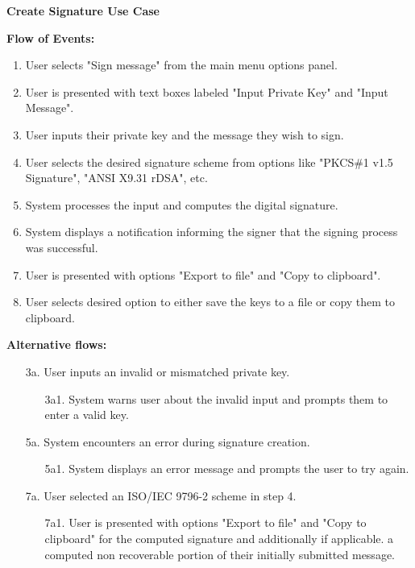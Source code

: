 \documentclass[]{final_report}
\theoremstyle{definition}
\begin{document}
\textbf{Create Signature Use Case}

\noindent\textbf{Flow of Events:}
\begin{enumerate}
    \item User selects "Sign message" from the main menu options panel.
    \item User is presented with text boxes labeled "Input Private Key" and "Input Message".
    \item User inputs their private key and the message they wish to sign.
    \item User selects the desired signature scheme from options like "PKCS\#1 v1.5 Signature", "ANSI X9.31 rDSA", etc.
    \item System processes the input and computes the digital signature.
    \item System displays a notification informing the signer that the signing process was successful.
    \item User is presented with options "Export to file" and "Copy to clipboard".
    \item User selects desired option to either save the keys to a file or copy them to clipboard.
\end{enumerate}

\noindent\textbf{Alternative flows:}
\begin{enumerate}
    \item[3a.] User inputs an invalid or mismatched private key.
    \begin{enumerate}
        \item[3a1.] System warns user about the invalid input and prompts them to enter a valid key.
    \end{enumerate}
    \item[5a.] System encounters an error during signature creation.
    \begin{enumerate}
        \item[5a1.] System displays an error message and prompts the user to try again.
    \end{enumerate}
    \item[7a.]  User selected an ISO\slash IEC 9796-2 scheme in step 4.
    \begin{enumerate}
        \item[7a1.] User is presented with options "Export to file" and "Copy to clipboard" for the computed signature and additionally if applicable. a computed non recoverable portion of their initially submitted message.
    \end{enumerate}
\end{enumerate}
\end{document}

